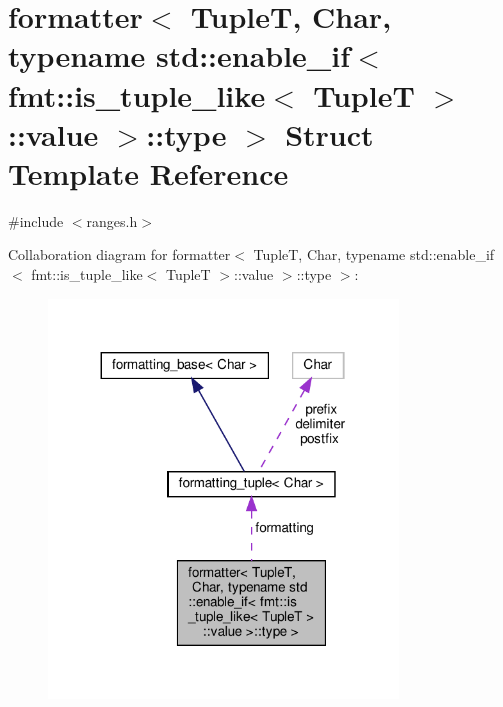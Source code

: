 \hypertarget{structformatter_3_01_tuple_t_00_01_char_00_01typename_01std_1_1enable__if_3_01fmt_1_1is__tuple__a8a88f793f5f612c28a21643fc88182d}{}\section{formatter$<$ TupleT, Char, typename std\+:\+:enable\+\_\+if$<$ fmt\+:\+:is\+\_\+tuple\+\_\+like$<$ TupleT $>$\+:\+:value $>$\+:\+:type $>$ Struct Template Reference}
\label{structformatter_3_01_tuple_t_00_01_char_00_01typename_01std_1_1enable__if_3_01fmt_1_1is__tuple__a8a88f793f5f612c28a21643fc88182d}


{\ttfamily \#include $<$ranges.\+h$>$}



Collaboration diagram for formatter$<$ TupleT, Char, typename std\+:\+:enable\+\_\+if$<$ fmt\+:\+:is\+\_\+tuple\+\_\+like$<$ TupleT $>$\+:\+:value $>$\+:\+:type $>$\+:
\nopagebreak
\begin{figure}[H]
\begin{center}
\leavevmode
\includegraphics[width=263pt]{structformatter_3_01_tuple_t_00_01_char_00_01typename_01std_1_1enable__if_3_01fmt_1_1is__tuple__1a7792b53e9328c92b267316a2a8aed3}
\end{center}
\end{figure}

